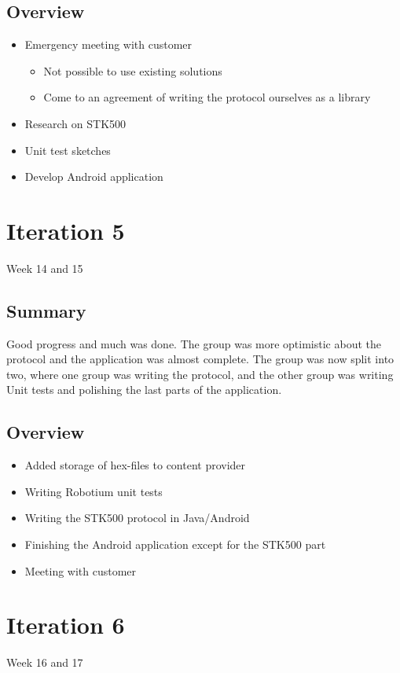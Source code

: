 \subsection{Overview}
\begin{itemize}
	\item{Emergency meeting with customer}
	\begin{itemize}
		\item{Not possible to use existing solutions}
		\item{Come to an agreement of writing the protocol ourselves as a library}
	\end{itemize}
	\item{Research on STK500}
	\item{Unit test sketches}
	\item{Develop Android application}
\end{itemize}

\section{Iteration 5}
Week 14 and 15
\subsection{Summary}
	Good progress and much was done. The group was more optimistic about the protocol and the application was almost complete.
	The group was now split into two, where one group was writing the protocol, and the other group was writing Unit tests and polishing the last parts of the application.

\subsection{Overview}
\begin{itemize}
	\item{Added storage of hex-files to content provider}
	\item{Writing Robotium unit tests}
	\item{Writing the STK500 protocol in Java/Android}
	\item{Finishing the Android application except for the STK500 part}
	\item{Meeting with customer}
\end{itemize}

\section{Iteration 6}
Week 16 and 17

